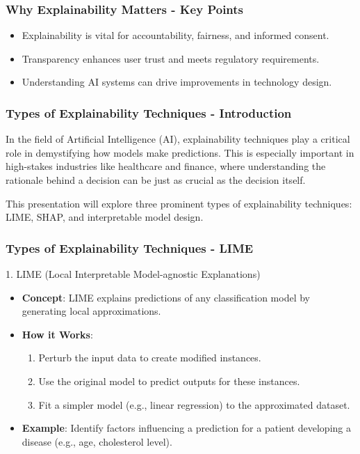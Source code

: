 \documentclass[aspectratio=169]{beamer}
\begin{document}
\begin{frame}[fragile]
    \frametitle{Why Explainability Matters - Key Points}
    \begin{itemize}
        \item Explainability is vital for accountability, fairness, and informed consent.
        \item Transparency enhances user trust and meets regulatory requirements.
        \item Understanding AI systems can drive improvements in technology design.
    \end{itemize}
\end{frame}

\begin{frame}[fragile]
  \frametitle{Types of Explainability Techniques - Introduction}
  In the field of Artificial Intelligence (AI), explainability techniques play a critical role in demystifying how models make predictions. This is especially important in high-stakes industries like healthcare and finance, where understanding the rationale behind a decision can be just as crucial as the decision itself.
  
  This presentation will explore three prominent types of explainability techniques: LIME, SHAP, and interpretable model design.
\end{frame}

\begin{frame}[fragile]
  \frametitle{Types of Explainability Techniques - LIME}
  \begin{block}{1. LIME (Local Interpretable Model-agnostic Explanations)}
    \begin{itemize}
      \item \textbf{Concept}: LIME explains predictions of any classification model by generating local approximations.
      \item \textbf{How it Works}:
        \begin{enumerate}
          \item Perturb the input data to create modified instances.
          \item Use the original model to predict outputs for these instances.
          \item Fit a simpler model (e.g., linear regression) to the approximated dataset.
        \end{enumerate}
      \item \textbf{Example}: Identify factors influencing a prediction for a patient developing a disease (e.g., age, cholesterol level).
    \end{itemize}
  \end{block}
\end{frame}
\end{document}
